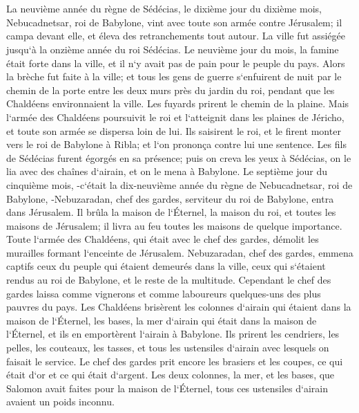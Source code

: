 \chapter{}

\verse La neuvième année du règne de Sédécias, le dixième jour du dixième mois, Nebucadnetsar, roi de Babylone, vint avec toute son armée contre Jérusalem; il campa devant elle, et éleva des retranchements tout autour. 
\verse La ville fut assiégée jusqu`à la onzième année du roi Sédécias. 
\verse Le neuvième jour du mois, la famine était forte dans la ville, et il n`y avait pas de pain pour le peuple du pays. 
\verse Alors la brèche fut faite à la ville; et tous les gens de guerre s`enfuirent de nuit par le chemin de la porte entre les deux murs près du jardin du roi, pendant que les Chaldéens environnaient la ville. Les fuyards prirent le chemin de la plaine. 
\verse Mais l`armée des Chaldéens poursuivit le roi et l`atteignit dans les plaines de Jéricho, et toute son armée se dispersa loin de lui. 
\verse Ils saisirent le roi, et le firent monter vers le roi de Babylone à Ribla; et l`on prononça contre lui une sentence. 
\verse Les fils de Sédécias furent égorgés en sa présence; puis on creva les yeux à Sédécias, on le lia avec des chaînes d`airain, et on le mena à Babylone. 
\verse Le septième jour du cinquième mois, -c`était la dix-neuvième année du règne de Nebucadnetsar, roi de Babylone, -Nebuzaradan, chef des gardes, serviteur du roi de Babylone, entra dans Jérusalem. 
\verse Il brûla la maison de l`Éternel, la maison du roi, et toutes les maisons de Jérusalem; il livra au feu toutes les maisons de quelque importance. 
\verse Toute l`armée des Chaldéens, qui était avec le chef des gardes, démolit les murailles formant l`enceinte de Jérusalem. 
\verse Nebuzaradan, chef des gardes, emmena captifs ceux du peuple qui étaient demeurés dans la ville, ceux qui s`étaient rendus au roi de Babylone, et le reste de la multitude. 
\verse Cependant le chef des gardes laissa comme vignerons et comme laboureurs quelques-uns des plus pauvres du pays. 
\verse Les Chaldéens brisèrent les colonnes d`airain qui étaient dans la maison de l`Éternel, les bases, la mer d`airain qui était dans la maison de l`Éternel, et ils en emportèrent l`airain à Babylone. 
\verse Ils prirent les cendriers, les pelles, les couteaux, les tasses, et tous les ustensiles d`airain avec lesquels on faisait le service. 
\verse Le chef des gardes prit encore les brasiers et les coupes, ce qui était d`or et ce qui était d`argent. 
\verse Les deux colonnes, la mer, et les bases, que Salomon avait faites pour la maison de l`Éternel, tous ces ustensiles d`airain avaient un poids inconnu. 

